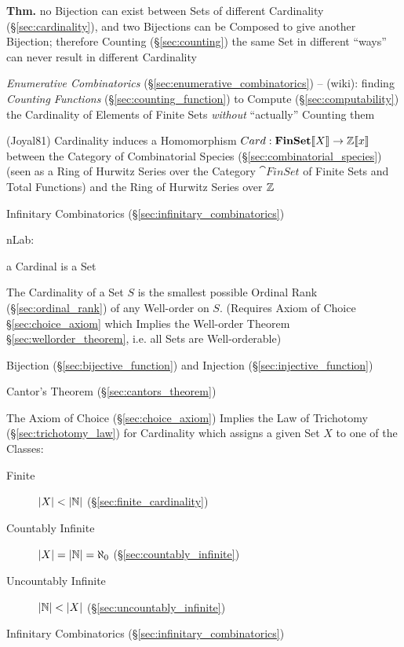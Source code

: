 \textbf{Thm.} no Bijection can exist between Sets of different
Cardinality (\S\ref{sec:cardinality}), and two Bijections can be Composed to
give another Bijection; therefore Counting (\S\ref{sec:counting}) the same Set
in different ``ways'' can never result in different Cardinality

\fist \emph{Enumerative Combinatorics} (\S\ref{sec:enumerative_combinatorics})
-- (wiki): finding \emph{Counting Functions} (\S\ref{sec:counting_function}) to
Compute (\S\ref{sec:computability}) the Cardinality of Elements of Finite Sets
\emph{without} ``actually'' Counting them

(Joyal81) Cardinality induces a Homomorphism
$Card : \mathbf{FinSet}\llbracket{X}\rrbracket \to \mathbb{Z}\llbracket{x}\rrbracket$
between the Category of Combinatorial Species
(\S\ref{sec:combinatorial_species}) (seen as a Ring of Hurwitz Series over
the Category $\cat{FinSet}$ of Finite Sets and Total Functions) and the Ring
of Hurwitz Series over $\mathbb{Z}$

\fist Infinitary Combinatorics (\S\ref{sec:infinitary_combinatorics})

nLab:

a Cardinal is a Set

The Cardinality of a Set $S$ is the smallest possible Ordinal Rank
(\S\ref{sec:ordinal_rank}) of any Well-order on $S$. (Requires Axiom
of Choice \S\ref{sec:choice_axiom} which Implies the Well-order
Theorem \S\ref{sec:wellorder_theorem}, i.e. all Sets are
Well-orderable)

Bijection (\S\ref{sec:bijective_function}) and Injection
(\S\ref{sec:injective_function})

Cantor's Theorem (\S\ref{sec:cantors_theorem})

The Axiom of Choice (\S\ref{sec:choice_axiom}) Implies the Law of
Trichotomy (\S\ref{sec:trichotomy_law}) for Cardinality which assigns
a given Set $X$ to one of the Classes:

\begin{description}
\item [Finite] $|X| < |\mathbb{N}|$ (\S\ref{sec:finite_cardinality})
\item [Countably Infinite] $|X| = |\mathbb{N}| = \aleph_0$
  (\S\ref{sec:countably_infinite})
\item [Uncountably Infinite] $|\mathbb{N}| < |X|$
  (\S\ref{sec:uncountably_infinite})
\end{description}

Infinitary Combinatorics (\S\ref{sec:infinitary_combinatorics})


